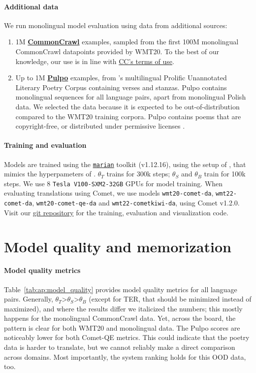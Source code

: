 \paragraph{Additional data}
We run monolingual model evaluation using data from additional sources:
\begin{enumerate}[noitemsep,topsep=0pt]
    \item 1M \href{https://www.statmt.org/wmt20/translation-task.html}{\textbf{CommonCrawl}} examples, sampled from the first 100M monolingual CommonCrawl datapoints provided by WMT20. To the best of our knowledge, our use is in line with \href{https://commoncrawl.org/terms-of-use}{CC's terms of use}.
    \item Up to 1M \href{https://huggingface.co/datasets/linhd-postdata/pulpo}{\textbf{Pulpo}} examples, from \citet{de2023alberti}'s multilingual Prolific Unannotated Literary Poetry Corpus containing verses and stanzas. Pulpo contains monolingual sequences for all language pairs, apart from monolingual Polish data. We selected the data because it is expected to be out-of-distribution compared to the WMT20 training corpora. Pulpo contains poems that are copyright-free, or distributed under permissive licenses \citep[][p.3]{de2023alberti}.
\end{enumerate}

\paragraph{Training and evaluation} Models are trained using the \href{https://marian-nmt.github.io/}{\texttt{marian}} toolkit (v1.12.16), using the setup of \citet{raunak2022finding}, that mimics the hyperpameters of \citet{vaswani2017attention}. $\theta_T$ trains for 300k steps; $\theta_S$ and $\theta_B$ train for 100k steps. We use 8 \texttt{Tesla V100-SXM2-32GB} GPUs for model training. 
When evaluating translations using Comet, we use models \texttt{wmt20-comet-da}, \texttt{wmt22-comet-da}, \texttt{wmt20-comet-qe-da} and \texttt{wmt22-cometkiwi-da}, using Comet v1.2.0.
Visit our \href{https://github.com/vyraun/memseqkd.git}{git repository} for the training, evaluation and visualization code.

\section{Model quality and memorization}
\label{ap:add_results}
\paragraph{Model quality metrics} Table~\ref{tab:ap:model_quality} provides model quality metrics for all language pairs.
Generally, $\theta_T$>$\theta_S$>$\theta_B$ (except for TER, that should be minimized instead of maximized), and where the results differ we italicized the numbers; this mostly happens for the monolingual CommonCrawl data. Yet, across the board, the pattern is clear for both WMT20 and monolingual data.
The Pulpo scores are noticeably lower for both Comet-QE metrics. This could indicate that the poetry data is harder to translate, but we cannot reliably make a direct comparison across domains. Most importantly, the system ranking holds for this OOD data, too.

